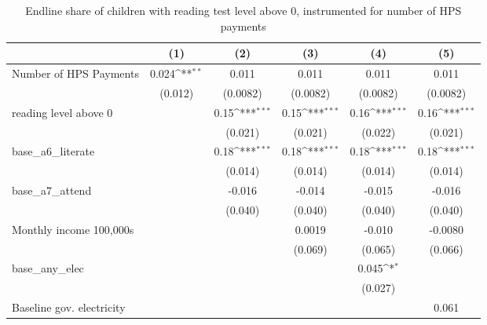 \begin{table}[htbp]\centering
\def\sym#1{\ifmmode^{#1}\else\(^{#1}\)\fi}
\caption{Endline share of children with reading test level above 0, instrumented for number of HPS payments}
\begin{tabular*}{1\hsize}{@{\hskip\tabcolsep\extracolsep\fill}l*{5}{c}}
\toprule
                &\multicolumn{1}{c}{(1)}         &\multicolumn{1}{c}{(2)}         &\multicolumn{1}{c}{(3)}         &\multicolumn{1}{c}{(4)}         &\multicolumn{1}{c}{(5)}         \\
\midrule
Number of HPS Payments&    0.024\sym{**} &    0.011         &    0.011         &    0.011         &    0.011         \\
                &  (0.012)         & (0.0082)         & (0.0082)         & (0.0082)         & (0.0082)         \\
reading level above 0&                  &     0.15\sym{***}&     0.15\sym{***}&     0.16\sym{***}&     0.16\sym{***}\\
                &                  &  (0.021)         &  (0.021)         &  (0.022)         &  (0.021)         \\
base\_a6\_literate&                  &     0.18\sym{***}&     0.18\sym{***}&     0.18\sym{***}&     0.18\sym{***}\\
                &                  &  (0.014)         &  (0.014)         &  (0.014)         &  (0.014)         \\
base\_a7\_attend  &                  &   -0.016         &   -0.014         &   -0.015         &   -0.016         \\
                &                  &  (0.040)         &  (0.040)         &  (0.040)         &  (0.040)         \\
Monthly income 100,000s&                  &                  &   0.0019         &   -0.010         &  -0.0080         \\
                &                  &                  &  (0.069)         &  (0.065)         &  (0.066)         \\
base\_any\_elec   &                  &                  &                  &    0.045\sym{*}  &                  \\
                &                  &                  &                  &  (0.027)         &                  \\
Baseline gov. electricity&                  &                  &                  &                  &    0.061         \\

\end{tabular*}
\end{table}
